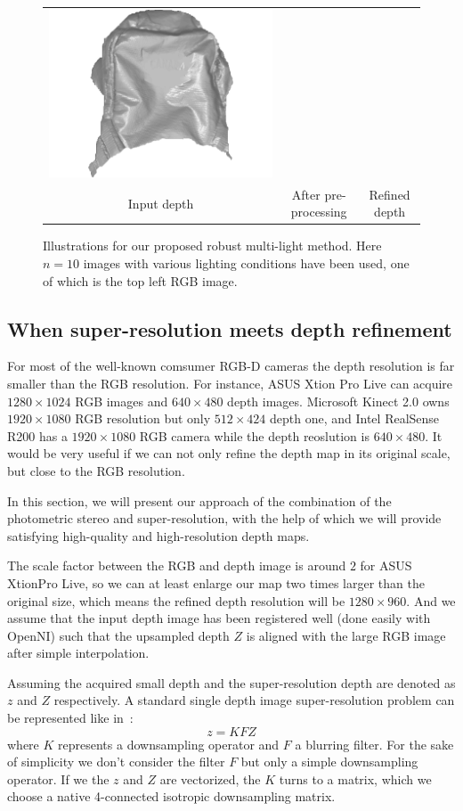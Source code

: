 \begin{figure}[!ht]
{\begin{tabular}{c| c c}
   \includegraphics[height = 0.25\linewidth]{figures/methodology/robust_backpack_shape.pdf}\\
{Input depth} & {After pre-processing} & {Refined depth}
 \end{tabular}}
\caption{Illustrations for our proposed robust multi-light method. Here $n = 10$ images with various lighting conditions have been used, one of which is the top left RGB image. }
\label{fig:robust_illustration}
\end{figure}




\subsection{When super-resolution meets depth refinement}
For most of the well-known comsumer RGB-D cameras the depth resolution is far smaller than the RGB resolution.
For instance, ASUS Xtion Pro Live can acquire $1280\times 1024$ RGB images and $640\times 480$ depth images. Microsoft Kinect 2.0 owns $1920\times1080$ RGB resolution but only $512\times424$ depth one, and Intel RealSense R200 has a $1920\times1080$ RGB camera while the depth reoslution is $640\times 480$.
It would be very useful if we can not only refine the depth map in its original scale, but close to the RGB resolution.  

In this section, we will present our approach of the combination of the photometric stereo and super-resolution, with the help of which we will provide satisfying high-quality and high-resolution depth maps. 

The scale factor between the RGB and depth image is around $2$ for ASUS XtionPro Live, so we can at least enlarge our map two times larger than the original size, which means the refined depth resolution will be $1280\times960$.
 And we assume that the input depth image has been registered well (done easily with OpenNI) such that the upsampled depth $Z$ is aligned with the large RGB image after simple interpolation.

Assuming the acquired small depth and the super-resolution depth are denoted as $z$ and $Z$ respectively.
A standard single depth image super-resolution problem can be represented like in~\cite{yang2010image}:
\begin{equation}\label{eq:sr_equation}
z = KFZ
\end{equation}
where $K$ represents a downsampling operator and $F$ a blurring filter.
For the sake of simplicity we don't consider the filter $F$ but only a simple downsampling operator.
If we the $z$ and $Z$ are vectorized, the $K$ turns to a matrix, which we choose a native 4-connected isotropic downsampling matrix.

